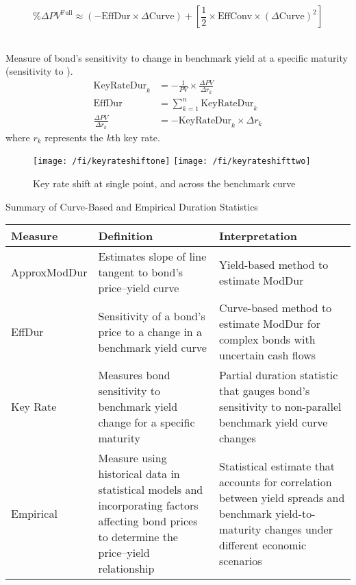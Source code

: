 \begin{remark} 
\begin{equation}
\% \Delta PV^{\text{Full}} \approx (-\text{EffDur} \times \Delta \text{Curve}) + \left[ \frac{1}{2} \times \text{EffConv} \times (\Delta \text{Curve})^2 \right] \nonumber
\end{equation}
\end{remark}

\begin{definition} \\
Measure of bond’s sensitivity to change in benchmark yield at a specific maturity (sensitivity to ).
\begin{align}
\text{KeyRateDur}_k &= - \frac{1}{PV} \times \frac{\Delta PV}{\Delta r_k} \nonumber \\
\text{EffDur} &= \sum\limits_{k=1}^n \text{KeyRateDur}_k \nonumber \\
\frac{\Delta PV}{\Delta r_k} &= -\text{KeyRateDur}_k \times \Delta r_k \nonumber
\end{align}
where $r_k$ represents the $k$th key rate.
\end{definition}

\begin{figure}[H]
\centering
\texttt{[image: /fi/keyrateshiftone]}
\texttt{[image: /fi/keyrateshifttwo]}
\caption{Key rate shift at single point, and across the benchmark curve}
\end{figure}

\begin{flushleft}
Summary of Curve-Based and Empirical Duration Statistics
\begin{tabularx}{\textwidth}{p{7em}|X|X}
\hline
\rowcolor{gray!30}
Measure & Definition & Interpretation \\
\hline
ApproxModDur & Estimates slope of line tangent to bond’s price–yield curve & Yield-based method to estimate ModDur \\
\hline
EffDur & Sensitivity of a bond’s price to a change in a benchmark yield curve & Curve-based method to estimate ModDur for complex bonds with uncertain cash flows \\
\hline
Key Rate & Measures bond sensitivity to benchmark yield change for a specific maturity & Partial duration statistic that gauges bond’s sensitivity to non-parallel benchmark yield curve changes \\
\hline
Empirical & Measure using historical data in statistical models and incorporating factors affecting bond prices to determine the price–yield relationship & Statistical estimate that accounts for correlation between yield spreads and benchmark yield-to-maturity changes under different economic scenarios \\
\hline
\end{tabularx}
\end{flushleft}